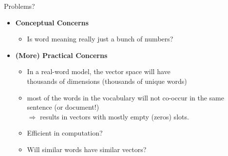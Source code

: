 \documentclass[professionalfonts, xcolor={usenames,svgnames,x11names,table}]{beamer}
\begin{document}
%
%
%
%

\begin{frame}{Problems?}
   \begin{itemize}
        \item \textbf{Conceptual Concerns}
            \begin{itemize}
               	 \item Is word meaning really just a bunch of numbers?
               \end{itemize}
       \end{itemize} 
      
      \vspace{0.3cm} 
      \begin{itemize}           
        \item \textbf{(More) Practical Concerns}
               \begin{itemize}
                \item In a real-word model, the vector space will have\\
                    thousands of dimensions (thousands of unique words)
                    \item most of the words in the vocabulary will not co-occur in the same sentence (or document!)\\
                    $\Rightarrow$ results in vectors with mostly empty (zeros) slots.
                      \item Efficient in computation?
                      \item Will similar words have similar vectors?
                         \end{itemize}
                            \end{itemize}

\end{frame}
\end{document}
